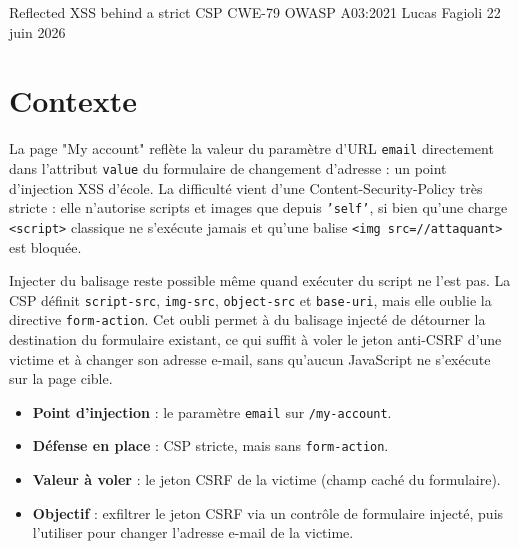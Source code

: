 \documentclass[11pt,a4paper]{article}
\begin{document}
\makecover
  {Reflected XSS behind a strict CSP}
  {CWE-79 \textperiodcentered{} OWASP A03\string:2021}
  {
  }
  {Lucas Fagioli}
  {22 juin 2026}

\section{Contexte}
La page "My account" reflète la valeur du paramètre d'URL
\texttt{email} directement dans l'attribut \texttt{value} du formulaire de
changement d'adresse : un point d'injection XSS d'école. La difficulté vient
d'une Content-Security-Policy très stricte : elle n'autorise scripts et images
que depuis \texttt{'self'}, si bien qu'une charge \lstinline|<script>|
classique ne s'exécute jamais et qu'une balise \lstinline|<img src=//attaquant>|
est bloquée.

Injecter du balisage reste possible même quand exécuter du script ne l'est pas.
La CSP définit \texttt{script-src}, \texttt{img-src}, \texttt{object-src} et
\texttt{base-uri}, mais elle oublie la directive \texttt{form-action}. Cet oubli
permet à du balisage injecté de détourner la destination du formulaire existant,
ce qui suffit à voler le jeton anti-CSRF d'une victime et à changer son adresse
e-mail, sans qu'aucun JavaScript ne s'exécute sur la page cible.

\begin{itemize}
  \item \textbf{Point d'injection} : le paramètre \texttt{email} sur \texttt{/my-account}.
  \item \textbf{Défense en place} : CSP stricte, mais sans \texttt{form-action}.
  \item \textbf{Valeur à voler} : le jeton CSRF de la victime (champ caché du formulaire).
  \item \textbf{Objectif} : exfiltrer le jeton CSRF via un contrôle de formulaire injecté, puis l'utiliser pour changer l'adresse e-mail de la victime.
\end{itemize}
\end{document}
